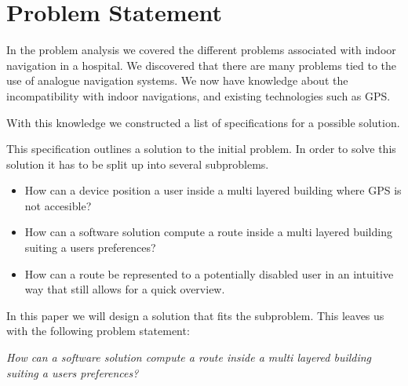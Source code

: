 \chapter{Problem Statement}




In the problem analysis we covered the different problems associated with indoor navigation in a hospital.
We discovered that there are many problems tied to the use of analogue navigation systems. We now have knowledge about the incompatibility with indoor navigations, and existing technologies such as GPS.



With this knowledge we constructed a list of specifications for a possible solution.




This specification outlines a solution to the initial problem. In order to solve this solution it has to be split up into several subproblems.

\begin{itemize}
	\item How can a device position a user inside a multi layered building where GPS is not accesible?
	\item How can a software solution compute a route inside a multi layered building suiting a users preferences?
	\item How can a route be represented to a potentially disabled user in an intuitive way that still allows for a quick overview.
\end{itemize}

In this paper we will design a solution that fits the  subproblem. This leaves us with the following problem statement:

\begin{displayquote}
    \textit{How can a software solution compute a route inside a multi layered building suiting a users preferences?}\label{sub:problem_statement}
\end{displayquote}
